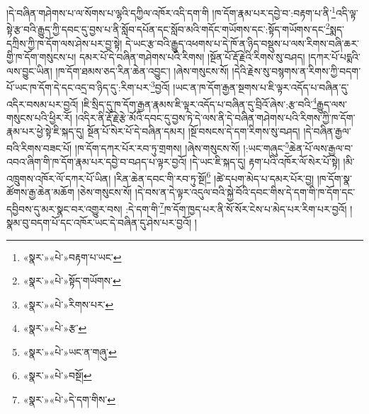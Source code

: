 །དེ་བཞིན་གཤེགས་པ་ལ་སོགས་པ་ལྷའི་དཀྱིལ་འཁོར་འདི་དག་གི །ཁ་དོག་རྣམ་པར་དབྱེ་བ་:བརྟག་པ་ནི་\footnote{«སྣར་»«པེ་»བརྟག་པ་ཡང་}འདི་ལྟ་སྟེ་རྩ་བའི་རྒྱུད་ཀྱི་དབང་དུ་བྱས་པ་ནི་སློབ་དཔོན་དང་སློབ་མའི་གདོང་གཡོགས་དང་:སྟོད་གཡོགས་དང་\footnote{«སྣར་»«པེ་»སྟོད་གཡོགས་}སྨད་དཀྲིས་ཀྱི་ཁ་དོག་ལས་ཤེས་པར་བྱ་སྟེ། དེ་ཡང་རྩ་བའི་རྒྱུད་འཕགས་པ་དེ་ཁོ་ན་ཉིད་བསྡུས་པ་ལས་རིགས་བཞི་ཆར་གྱི་ཁ་དོག་གསུངས་པ། དམར་པོ་དེ་བཞིན་གཤེགས་པའི་རིགས། །སྔོན་པོ་རྡོ་རྗེའི་རིགས་སུ་བཤད། །དཀར་པོ་པདྨའི་ལས་བྱུང་ཡིན། །ཁ་དོག་ཐམས་ཅད་རིན་ཆེན་འབྱུང་། །ཞེས་གསུངས་སོ། །དེའི་རྗེས་སུ་བསྙགས་ན་རིགས་ཀྱི་བདག་པོ་ཡང་ཁ་དོག་དེ་དང་འདྲ་བ་ཉིད་དུ་:རིག་པར་\footnote{«སྣར་»«པེ་»རིགས་པར་}བྱའོ། །ཡང་ན་ཁ་དོག་རྒྱན་སྔགས་པ་ཇི་ལྟར་འདོད་པ་བཞིན་དུ་འདིར་བསམ་པར་བྱའོ། །ཇི་སྲིད་དུ་ཁ་དོག་རྒྱན་རྣམས་ཇི་ལྟར་འདོད་པ་བཞིན་དུ་བྲིའོ་ཞེས་:རྩ་བའི་\footnote{«སྣར་»«པེ་»རྩ་}རྒྱུད་ལས་གསུངས་པའི་ཕྱིར་རོ། །འདིར་ནི་རྡོ་རྗེ་རྩེ་མོའི་དབང་དུ་བྱས་ཏེ་དེ་ལས་ནི་དེ་བཞིན་གཤེགས་པའི་རིགས་ཀྱི་ཁ་དོག་རྣམ་པར་ཕྱེ་སྟེ་ཇི་སྐད་དུ། སྔོན་པོ་སེར་པོ་དེ་བཞིན་དམར། །སྔོ་བསངས་དེ་དག་རིགས་སུ་བཤད། །དེ་བཞིན་རྒྱལ་བའི་རིགས་བཟང་པོ། །ཁ་དོག་དཀར་པོར་རབ་ཏུ་གྲགས། །ཞེས་གསུངས་སོ། །:ཡང་གཞུང་\footnote{«སྣར་»«པེ་»ཡང་ན་གཞུ་}ཆེན་པོ་ལས་རྒྱལ་བ་འབའ་ཞིག་གི་ཁ་དོག་རྣམ་པར་དབྱེ་བ་བཤད་པ་ལྟར་བྱའོ། །དེ་ཡང་ཇི་སྐད་དུ། རྟག་པའི་འཁོར་ལོ་སེར་པོ་སྟེ། །མི་འཁྲུགས་འཁོར་ལོ་དཀར་པོ་ཡིན། །རིན་ཆེན་དབང་གི་རབ་ཏུ་སྔོ།\footnote{«སྣར་»«པེ་»བསྔོ།} །ཚེ་དཔག་མེད་པ་དམར་པོར་བྱ། །ཁ་དོག་སྣ་ཚོགས་རྒྱ་ཆེན་མཆོག །ཅེས་གསུངས་སོ། །དེ་བས་ན་དེ་ལྟར་འདུལ་བའི་སྐྱེ་བོའི་དབང་གིས་དེ་དག་གི་ཁ་དོག་དང་དབྱིབས་དུ་མར་སྣང་བར་འགྱུར་བས། :དེ་དག་གི་\footnote{«སྣར་»«པེ་»དེ་དག་གིས་}ཁ་དོག་ཁྱད་པར་ནི་སོ་སོར་ངེས་པ་མེད་པར་རིག་པར་བྱའོ། །སྣམ་བུ་བདག་པོ་དང་འཁོར་ཡང་དེ་བཞིན་དུ་ཤེས་པར་བྱའོ། །
